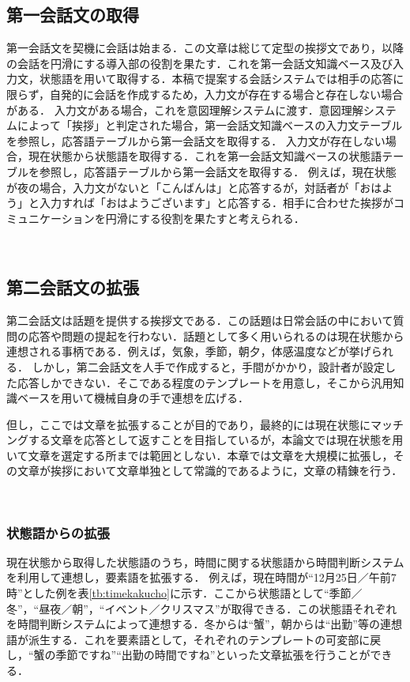 \subsection{第一会話文の取得}
第一会話文を契機に会話は始まる．この文章は総じて定型の挨拶文であり，以降の会話を円滑にする導入部の役割を果たす．これを第一会話文知識ベース及び入力文，状態語を用いて取得する．本稿で提案する会話システムでは相手の応答に限らず，自発的に会話を作成するため，入力文が存在する場合と存在しない場合がある．
入力文がある場合，これを意図理解システムに渡す．意図理解システムによって「挨拶」と判定された場合，第一会話文知識ベースの入力文テーブルを参照し，応答語テーブルから第一会話文を取得する．
入力文が存在しない場合，現在状態から状態語を取得する．これを第一会話文知識ベースの状態語テーブルを参照し，応答語テーブルから第一会話文を取得する．
例えば，現在状態が夜の場合，入力文がないと「こんばんは」と応答するが，対話者が「おはよう」と入力すれば「おはようございます」と応答する．相手に合わせた挨拶がコミュニケーションを円滑にする役割を果たすと考えられる．

\\
\subsection{第二会話文の拡張} \label{kakucho}
第二会話文は話題を提供する挨拶文である．この話題は日常会話の中において質問の応答や問題の提起を行わない．話題として多く用いられるのは現在状態から連想される事柄である．例えば，気象，季節，朝夕，体感温度などが挙げられる．
しかし，第二会話文を人手で作成すると，手間がかかり，設計者が設定した応答しかできない．そこである程度のテンプレートを用意し，そこから汎用知識ベースを用いて機械自身の手で連想を広げる．

但し，ここでは文章を拡張することが目的であり，最終的には現在状態にマッチングする文章を応答として返すことを目指しているが，本論文では現在状態を用いて文章を選定する所までは範囲としない．本章では文章を大規模に拡張し，その文章が挨拶において文章単独として常識的であるように，文章の精錬を行う．

\\
\subsubsection{状態語からの拡張}
現在状態から取得した状態語のうち，時間に関する状態語から時間判断システムを利用して連想し，要素語を拡張する．
例えば，現在時間が“12月25日／午前7時”とした例を表\ref{tb:timekakucho}に示す．ここから状態語として“季節／冬”，“昼夜／朝”，“イベント／クリスマス”が取得できる．この状態語それぞれを時間判断システムによって連想する．冬からは“蟹”，朝からは“出勤”等の連想語が派生する．これを要素語として，それぞれのテンプレートの可変部に戻し，“蟹の季節ですね”“出勤の時間ですね”といった文章拡張を行うことができる．

